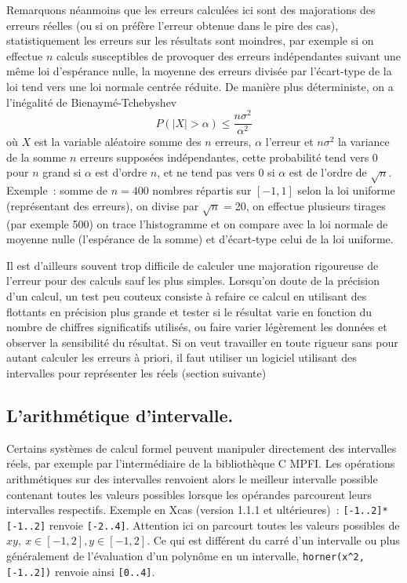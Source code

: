 \documentclass[a4paper,11pt]{article}
\begin{document}
\begin{giacjshere}
Remarquons néanmoins que les erreurs calculées ici sont des majorations
des erreurs réelles (ou si on préfère l'erreur obtenue dans le pire
des cas), statistiquement les erreurs sur les résultats sont moindres,
par exemple si on effectue $n$ calculs susceptibles de provoquer
des erreurs ind\'ependantes suivant une m\^eme loi d'esp\'erance nulle, la moyenne des
erreurs divis\'ee par l'\'ecart-type de la loi
tend vers une loi normale centr\'ee r\'eduite. De mani\`ere plus
d\'eterministe, on a l'in\'egalit\'e de Bienaym\'e-Tchebyshev
\[ P(|X|>\alpha) \leq \frac{n\sigma^2}{\alpha^2}\]
o\`u $X$ est la variable al\'eatoire somme des $n$ erreurs, $\alpha$
l'erreur et $n\sigma^2$ la variance de la somme $n$ erreurs
suppos\'ees ind\'ependantes, cette probabilit\'e tend vers 0 pour $n$
grand si $\alpha$ est d'ordre $n$, et ne tend
pas vers 0 si $\alpha$ est de l'ordre de $\sqrt{n}$.
Exemple~: somme de $n=400$ nombres r\'epartis sur $[-1,1]$ selon la loi
uniforme (repr\'esentant des erreurs), on divise par $\sqrt{n}=$20, 
on effectue plusieurs tirages (par exemple 500) on trace l'histogramme et 
on compare avec la loi normale de moyenne
nulle (l'esp\'erance de la somme) et d'\'ecart-type celui de la loi
uniforme.

Il est d'ailleurs souvent trop difficile de calculer une majoration
rigoureuse de l'erreur pour des calculs sauf les plus simples.
Lorsqu'on doute de la précision d'un calcul, un test peu couteux consiste
à refaire ce calcul en utilisant des flottants en précision plus
grande et tester si le résultat varie en fonction du nombre de chiffres
significatifs utilisés, ou faire varier l\'eg\`erement
les donn\'ees et observer la sensibilit\'e du r\'esultat.
Si on veut travailler en toute rigueur sans
pour autant calculer les erreurs à priori, il faut utiliser un logiciel
utilisant des intervalles pour représenter les réels (section suivante)

\subsection{L'arithm\'etique d'intervalle.}
Certains syst\`emes de calcul formel peuvent manipuler directement
des intervalles r\'eels, par exemple par l'interm\'ediaire de la
bibliothèque C MPFI. Les op\'erations arithm\'etiques sur des
intervalles renvoient alors le meilleur intervalle possible contenant
toutes les valeurs possibles lorsque les op\'erandes parcourent
leurs intervalles respectifs.
Exemple en Xcas (version 1.1.1 et ult\'erieures)~:
\verb|[-1..2]*[-1..2]| renvoie \verb|[-2..4]|.
Attention ici on parcourt toutes les valeurs possibles de 
$xy, \ x \in [-1,2], y \in [-1,2]$. Ce qui est diff\'erent du carr\'e
d'un intervalle ou plus g\'en\'eralement de l'\'evaluation
d'un polyn\^ome en un intervalle, \verb|horner(x^2,[-1..2])|
renvoie ainsi \verb|[0..4]|.


\end{giacjshere}
\end{document}
